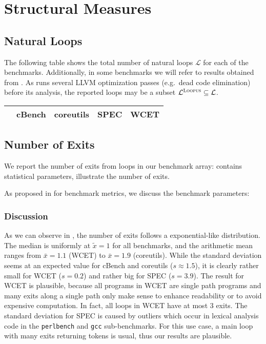 \section{Structural Measures}

\subsection{Natural Loops}

    The following table shows the total number of natural loops $\mathcal{L}$ for each of the benchmarks. Additionally, in some benchmarks we will refer to results obtained from \loopus{}. As \loopus{} runs several LLVM optimization passes (e.g.\ dead code elimination) before its analysis, the reported loops may be a subset $\mathcal{L}^{\textsc{Loopus}} \subseteq \mathcal{L}$.

    \begin{table}[h]
        \begin{tabular}{lS[table-format=4.0]S[table-format=4.0]S[table-format=5.0]S[table-format=3.0]}\toprule
            & {cBench} & {coreutils} & {SPEC} & {WCET} \\ \midrule
             \bottomrule
        \end{tabular}
    \end{table}

\subsection{Number of Exits}
    \label{sub:number_of_exits}

    We report the number of exits from loops in our benchmark array:  contains statistical parameters,  illustrate the number of exits.

    As proposed in  for benchmark metrics, we discuss the benchmark parameters:

    \subsubsection{Discussion}
    As we can observe in , the number of exits follows a exponential-like distribution. The median is uniformly at $\tilde{x} = 1$ for all benchmarks, and the arithmetic mean ranges from $\bar{x} = 1.1$ (WCET) to $\bar{x} = 1.9$ (coreutils). While the standard deviation seems at an expected value for cBench and coreutils ($s \approx 1.5$), it is clearly rather small for WCET ($s = 0.2$) and rather big for SPEC ($s = 3.9$). The result for WCET is plausible, because all programs in WCET are single path programs and many exits along a single path only make sense to enhance readability or to avoid expensive computation. In fact, all loops in WCET have at most 3 exits. The standard deviation for SPEC is caused by outliers which occur in lexical analysis code in the \texttt{perlbench} and \texttt{gcc} sub-benchmarks. For this use case, a main loop with many exits returning tokens is usual, thus our results are plausible.

